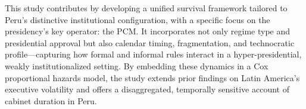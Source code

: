 \documentclass[a4paper, 12pt]{article}
\begin{document}
This study contributes by developing a unified survival framework tailored to Peru’s distinctive institutional configuration, with a specific focus on the presidency's key operator: the PCM. It incorporates not only regime type and presidential approval but also calendar timing, fragmentation, and technocratic profile—capturing how formal and informal rules interact in a hyper-presidential, weakly institutionalized setting. By embedding these dynamics in a Cox proportional hazards model, the study extends prior findings on Latin America’s executive volatility and offers a disaggregated, temporally sensitive account of cabinet duration in Peru.




% 
% 
% 
\end{document}
